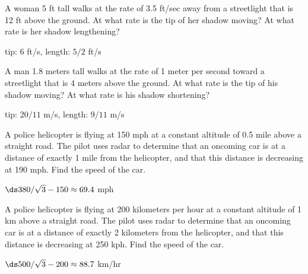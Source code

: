 \begin{exercises}

\begin{exercise}
A woman 5 ft tall walks at the rate of 3.5 ft/sec away from a streetlight
that is 12 ft above the ground.  At what rate is the tip of her shadow
moving?  At what rate is her shadow lengthening?
\begin{answer} tip: 6 ft/s, length: $5/2$ ft/s
\end{answer}\end{exercise}

\begin{exercise} A man 1.8 meters tall walks at the rate of 1 meter per
second toward a streetlight that is 4 meters above the ground.  At
what rate is the tip of his shadow moving?  At what rate is his shadow
shortening?
\begin{answer} tip: $20/11$ m/s, length: $9/11$ m/s
\end{answer}\end{exercise}

\begin{exercise}
A police helicopter is flying at 150 mph at a constant altitude of 0.5 mile
above a straight road.  The pilot uses radar to determine that an oncoming
car is at a distance of exactly 1 mile from the helicopter, and that this
distance is decreasing at 190 mph.  Find the speed of the car.
\begin{answer} $\ds 380/\sqrt3-150\approx 69.4$ mph
\end{answer}\end{exercise}

\begin{exercise} A police helicopter is flying at 200 kilometers per hour at
a constant altitude of 1 km above a straight road.  The pilot uses
radar to determine that an oncoming car is at a distance of exactly 2
kilometers from the helicopter, and that this distance is decreasing at 250
kph.  Find the speed of the car.
\begin{answer} $\ds 500/\sqrt3-200\approx 88.7$ km/hr
\end{answer}\end{exercise}


\end{exercises}
